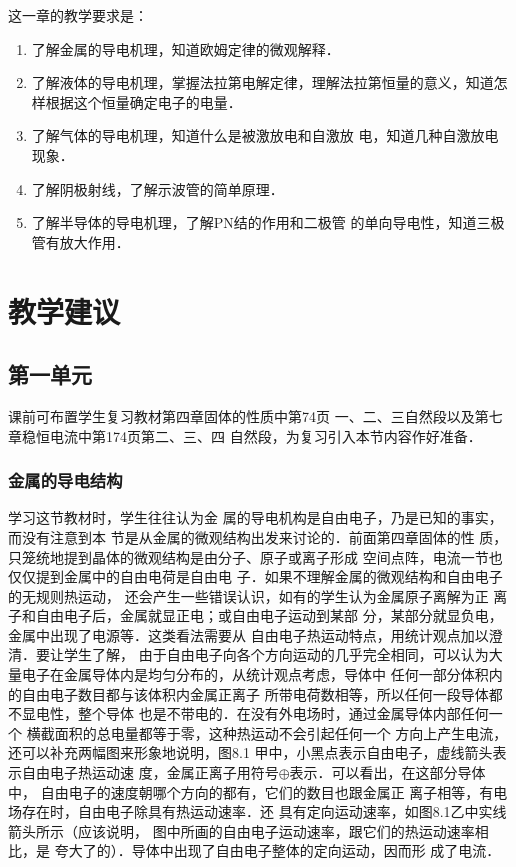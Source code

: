 这一章的教学要求是：
\begin{enumerate}
    \item 了解金属的导电机理，知道欧姆定律的微观解释．
    \item 了解液体的导电机理，掌握法拉第电解定律，理解法拉第恒量的意义，知道怎样根据这个恒量确定电子的电量．
    \item 了解气体的导电机理，知道什么是被激放电和自激放
    电，知道几种自激放电现象．
    \item 了解阴极射线，了解示波管的简单原理．
    \item 了解半导体的导电机理，了解PN结的作用和二极管
    的单向导电性，知道三极管有放大作用．
\end{enumerate}

\section{教学建议}
\subsection{第一单元}
课前可布置学生复习教材第四章固体的性质中第74页
一、二、三自然段以及第七章稳恒电流中第174页第二、三、四
自然段，为复习引入本节内容作好准备．

\subsubsection{金属的导电结构}

学习这节教材时，学生往往认为金
属的导电机构是自由电子，乃是已知的事实，而没有注意到本
节是从金属的微观结构出发来讨论的．前面第四章固体的性
质，只笼统地提到晶体的微观结构是由分子、原子或离子形成
空间点阵，电流一节也仅仅提到金属中的自由电荷是自由电
子．如果不理解金属的微观结构和自由电子的无规则热运动，
还会产生一些错误认识，如有的学生认为金属原子离解为正
离子和自由电子后，金属就显正电；或自由电子运动到某部
分，某部分就显负电，金属中出现了电源等．这类看法需要从
自由电子热运动特点，用统计观点加以澄清．要让学生了解，
由于自由电子向各个方向运动的几乎完全相同，可以认为大
量电子在金属导体内是均匀分布的，从统计观点考虑，导体中
任何一部分体积内的自由电子数目都与该体积内金属正离子
所带电荷数相等，所以任何一段导体都不显电性，整个导体
也是不带电的．在没有外电场时，通过金属导体内部任何一个
横截面积的总电量都等于零，这种热运动不会引起任何一个
方向上产生电流，还可以补充两幅图来形象地说明，图8.1
甲中，小黑点表示自由电子，虚线箭头表示自由电子热运动速
度，金属正离子用符号$\oplus$表示．可以看出，在这部分导体中，
自由电子的速度朝哪个方向的都有，它们的数目也跟金属正
离子相等，有电场存在时，自由电子除具有热运动速率．还
具有定向运动速率，如图8.1乙中实线箭头所示（应该说明，
图中所画的自由电子运动速率，跟它们的热运动速率相比，是
夸大了的）．导体中出现了自由电子整体的定向运动，因而形
成了电流．


